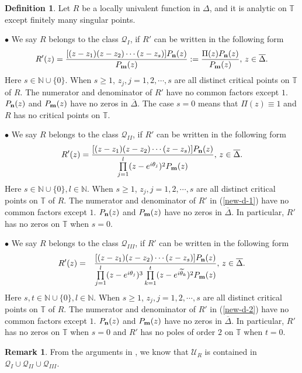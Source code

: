 \documentclass[10pt]{amsart}
\theoremstyle{definition}    %
\newtheorem{definition}[theorem]{Definition}
\newtheorem{remark}[theorem]{Remark}
\numberwithin{equation}{section}
\begin{document}
\begin{definition}Let $R$ be a locally univalent function in $\Delta$, and it is analytic on $\mathbb{T}$ except finitely many singular points.

$\bullet$ We say $R$ belongs to the class $\mathcal{Q}_I$, if $R'$ can be written in the following form
 \begin{equation}\label{new-d-0}R'(z)=\frac{[(z-z_1)(z-z_2)\cdots(z-z_s)]P_{\bf n}(z)}{P_{\bf m}(z)}:=\frac{\Pi(z)P_{\bf n}(z)}{P_{\bf m}(z)}, \,z\in \overline{\Delta}.\end{equation}
Here $s\in \mathbb{N}\cup \{0\}$. When $s\geq 1$, $z_j, j=1,2,\cdots, s$ are all distinct critical points on $\mathbb{T}$ of $R$. The numerator and denominator of $R'$ have no common factors except $1$. $P_{\bf n}(z)$ and $P_{\bf m}(z)$ have no zeros in $\overline{\Delta}$. The case $s=0$ means that $\Pi(z)\equiv1$ and $R$ has no critical points on $\mathbb{T}$.

$\bullet$ We say $R$ belongs to the class $\mathcal{Q}_{II}$, if $R'$ can be written in the following form
\begin{eqnarray}\label{new-d-1}
R'(z)=\frac{[(z-z_1)(z-z_2)\cdots(z-z_s)]P_{\bf n}(z)}{\prod\limits_{j=1}^{l}(z-e^{i\theta_j})^2 P_{{\bf m}}(z)}, \,z\in \overline{\Delta}. \end{eqnarray}
Here $s\in \mathbb{N}\cup \{0\}, l\in \mathbb{N}$. When $s\geq 1$, $z_j, j=1,2,\cdots, s$ are all distinct critical points on $\mathbb{T}$ of $R$. The numerator and denominator of $R'$ in (\ref{new-d-1}) have no common factors except $1$. $P_{\bf n}(z)$ and $P_{\bf m}(z)$ have no zeros in $\overline{\Delta}$. In particular, $R'$ has no zeros on $\mathbb{T}$ when $s=0$. 

$\bullet$ We say $R$ belongs to the class $\mathcal{Q}_{III}$, if $R'$ can be written in the following form
\begin{eqnarray}\label{new-d-2}
R'(z)&=& \frac{[(z-z_1)(z-z_2)\cdots(z-z_s)]P_{\bf n}(z)}{\prod\limits_{j=1}^{l}(z-e^{i\theta_j})^3\prod\limits_{k=1}^{t}(z-e^{i\widetilde{\theta}_k})^2P_{\bf m}(z)}, \,z\in \overline{\Delta}.\end{eqnarray}
Here $s, t\in \mathbb{N}\cup \{0\}, l\in \mathbb{N}$. When $s\geq 1$, $z_j, j=1,2,\cdots, s$ are all distinct critical points on $\mathbb{T}$ of $R$. The numerator and denominator of $R'$ in (\ref{new-d-2}) have no common factors except $1$. $P_{\bf n}(z)$ and $P_{\bf m}(z)$ have no zeros in $\overline{\Delta}$. In particular, $R'$ has no zeros on $\mathbb{T}$ when $s=0$ and $R'$ has no 
poles of order $2$ on $\mathbb{T}$ when $t=0$. 
\end{definition}
\begin{remark}
From the arguments in \cite{Jin-c}, we know that $\mathcal{U}_R$ is contained in ${\mathcal{Q}_{I}} \cup  {\mathcal{Q}_{II}} \cup  {\mathcal{Q}_{III}}.$  
\end{remark}
\end{document}
